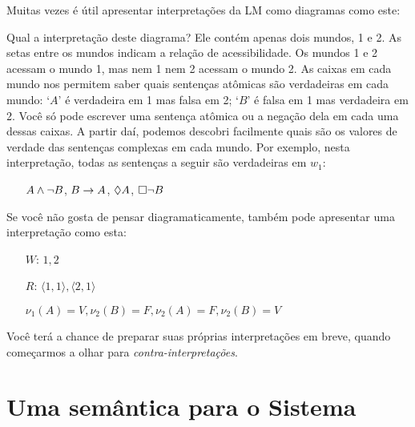  Muitas vezes é útil apresentar interpretações da LM como diagramas como este:
\begin{center}
\end{center}
Qual a interpretação deste diagrama? Ele contém apenas dois mundos,  1 e 2. As setas entre os mundos indicam a relação de acessibilidade. Os mundos 1 e  2 acessam o mundo 1, mas nem 1 nem 2 acessam o mundo 2. As caixas em cada mundo nos permitem saber quais sentenças atômicas são verdadeiras em cada mundo: `$A$' é verdadeira em  1 mas  falsa em 2; `$B$' é  falsa em 1 mas verdadeira em 2. Você só pode escrever uma sentença atômica ou a negação dela  em cada uma dessas caixas. A partir daí, podemos descobri facilmente  quais são   os valores de verdade das sentenças complexas em cada mundo. Por exemplo,  nesta interpretação, todas as sentenças a seguir são verdadeiras em  $w_1$: 
 
\begin{itemize}
	\item[]$A\wedge\neg B$, $B\rightarrow A$, $\Diamond A$, $\Box\neg B$
\end{itemize}
Se você não gosta de pensar diagramaticamente, também pode apresentar uma interpretação como esta:
\begin{itemize}
	\item[$W$:]$1,2$
	\item[$R$:]$\langle 1,1\rangle, \langle 2,1\rangle$
	\item[]$\nu_{1}(A)=V, \nu_{2}(B)=F, \nu_{2}(A)=F, \nu_{2}(B)=V$
\end{itemize}
Você terá a chance de preparar suas próprias interpretações 
em breve, quando começarmos a olhar para \emph{contra-interpretações}.

\section{Uma semântica para o Sistema \mlK}
\label{SemanticsK}

